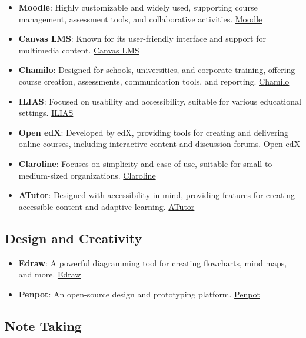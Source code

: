 \documentclass[
  letterpaper,
  DIV=11,
  numbers=noendperiod]{scrreprt}
\begin{document}
\begin{itemize}
\item
  \textbf{Moodle}: Highly customizable and widely used, supporting
  course management, assessment tools, and collaborative activities.
  \href{https://moodle.org/}{Moodle}
\item
  \textbf{Canvas LMS}: Known for its user-friendly interface and support
  for multimedia content. \href{https://www.canvaslms.com/}{Canvas LMS}
\item
  \textbf{Chamilo}: Designed for schools, universities, and corporate
  training, offering course creation, assessments, communication tools,
  and reporting. \href{https://chamilo.org/}{Chamilo}
\item
  \textbf{ILIAS}: Focused on usability and accessibility, suitable for
  various educational settings. \href{https://www.ilias.de/}{ILIAS}
\item
  \textbf{Open edX}: Developed by edX, providing tools for creating and
  delivering online courses, including interactive content and
  discussion forums. \href{https://open.edx.org/}{Open edX}
\item
  \textbf{Claroline}: Focuses on simplicity and ease of use, suitable
  for small to medium-sized organizations.
  \href{https://claroline.net/}{Claroline}
\item
  \textbf{ATutor}: Designed with accessibility in mind, providing
  features for creating accessible content and adaptive learning.
  \href{https://atutor.github.io/}{ATutor}
\end{itemize}

\subsection{Design and Creativity 🎨}\label{design-and-creativity}

\begin{itemize}
\item
  \textbf{Edraw}: A powerful diagramming tool for creating flowcharts,
  mind maps, and more. \href{https://edraw.srv.viridis.info/}{Edraw}
\item
  \textbf{Penpot}: An open-source design and prototyping platform.
  \href{https://penpot.srv.viridis.info/}{Penpot}
\end{itemize}

\subsection{Note Taking 📝}\label{note-taking}
\end{document}
